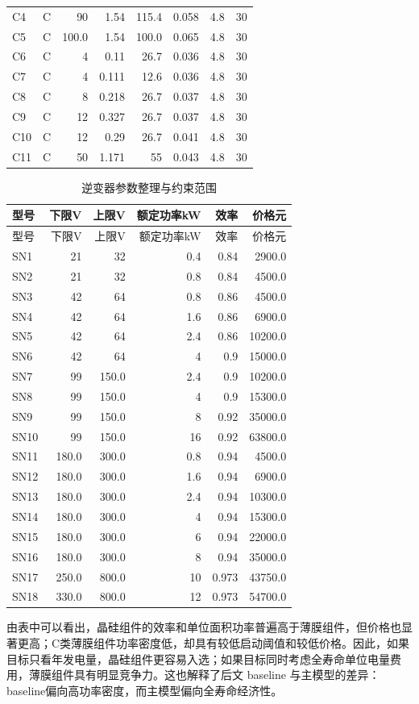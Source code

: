 \documentclass[UTF8,a4paper,12pt]{ctexart}
\begin{document}
\begin{center}
\begin{longtable}{lrrrrrrr}
C4 & C & 90 & 1.54 & 115.4 & 0.058 & 4.8 & 30\\
C5 & C & 100.0 & 1.54 & 100.0 & 0.065 & 4.8 & 30\\
C6 & C & 4 & 0.11 & 26.7 & 0.036 & 4.8 & 30\\
C7 & C & 4 & 0.111 & 12.6 & 0.036 & 4.8 & 30\\
C8 & C & 8 & 0.218 & 26.7 & 0.037 & 4.8 & 30\\
C9 & C & 12 & 0.327 & 26.7 & 0.037 & 4.8 & 30\\
C10 & C & 12 & 0.29 & 26.7 & 0.041 & 4.8 & 30\\
C11 & C & 50 & 1.171 & 55 & 0.043 & 4.8 & 30\\
\bottomrule
\end{longtable}\end{center}
\begin{center}\small
\begin{longtable}{lrrrrr}
\caption{逆变器参数整理与约束范围}\label{tab:invclean}\\
\toprule
型号 & 下限V & 上限V & 额定功率kW & 效率 & 价格元\\\midrule
\endfirsthead
\toprule
型号 & 下限V & 上限V & 额定功率kW & 效率 & 价格元\\\midrule
\endhead
SN1 & 21 & 32 & 0.4 & 0.84 & 2900.0\\
SN2 & 21 & 32 & 0.8 & 0.84 & 4500.0\\
SN3 & 42 & 64 & 0.8 & 0.86 & 4500.0\\
SN4 & 42 & 64 & 1.6 & 0.86 & 6900.0\\
SN5 & 42 & 64 & 2.4 & 0.86 & 10200.0\\
SN6 & 42 & 64 & 4 & 0.9 & 15000.0\\
SN7 & 99 & 150.0 & 2.4 & 0.9 & 10200.0\\
SN8 & 99 & 150.0 & 4 & 0.9 & 15300.0\\
SN9 & 99 & 150.0 & 8 & 0.92 & 35000.0\\
SN10 & 99 & 150.0 & 16 & 0.92 & 63800.0\\
SN11 & 180.0 & 300.0 & 0.8 & 0.94 & 4500.0\\
SN12 & 180.0 & 300.0 & 1.6 & 0.94 & 6900.0\\
SN13 & 180.0 & 300.0 & 2.4 & 0.94 & 10300.0\\
SN14 & 180.0 & 300.0 & 4 & 0.94 & 15300.0\\
SN15 & 180.0 & 300.0 & 6 & 0.94 & 22000.0\\
SN16 & 180.0 & 300.0 & 8 & 0.94 & 35000.0\\
SN17 & 250.0 & 800.0 & 10 & 0.973 & 43750.0\\
SN18 & 330.0 & 800.0 & 12 & 0.973 & 54700.0\\
\bottomrule
\end{longtable}\end{center}
由表中可以看出，晶硅组件的效率和单位面积功率普遍高于薄膜组件，但价格也显著更高；C类薄膜组件功率密度低，却具有较低启动阈值和较低价格。因此，如果目标只看年发电量，晶硅组件更容易入选；如果目标同时考虑全寿命单位电量费用，薄膜组件具有明显竞争力。这也解释了后文 baseline 与主模型的差异：baseline偏向高功率密度，而主模型偏向全寿命经济性。
\end{document}

